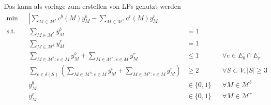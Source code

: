 \documentclass[ngerman,aspectratio=169,10pt]{beamer}
\begin{document}
\begin{frame}{Das kann als vorlage zum erstellen von LPs genutzt werden}
   \begin{align}
   \min    && \left|\sum_{M\in\mathcal{M}^b}c^b(M)y_M^b-\sum_{M\in\mathcal{M}^r}c^r(M)y_M^r\right| \tag{Z}\label{eq:z}\\
   \text{s.t.} && \sum_{M\in\mathcal{M}^b}y_M^b &=1&& \tag{C1}\label{eq:c1}\\
   && \sum_{M\in\mathcal{M}^r}y_M^r &=1&& \tag{C2}\label{eq:c2}\\
   && \sum_{M\in\mathcal{M}^b:e\in M}y_M^b+\sum_{M\in\mathcal{M}^r:e\in M}y_M^r &\leq1 &&\forall e\in E_b\cap E_r \tag{C3}\label{eq:c3}\\
   && \sum_{e\in\delta(S)}\left(\sum_{M\in\mathcal{M}^b:e\in M}y_M^b+\sum_{M\in\mathcal{M}^r:e\in M}y_M^r\right) &\geq 2 &&\forall S\subset V, |S| \geq 3 \tag{C4}\label{eq:c4}\\[0.5cm]
   && y_M^b &\in\{0,1\} &&\forall M\in\mathcal{M}^b \tag{C5}\label{eq:c5}\\
   && y_M^r &\in\{0,1\} &&\forall M\in\mathcal{M}^r \tag{C6}\label{eq:c6}
   \end{align}
\end{frame}
\end{document}
